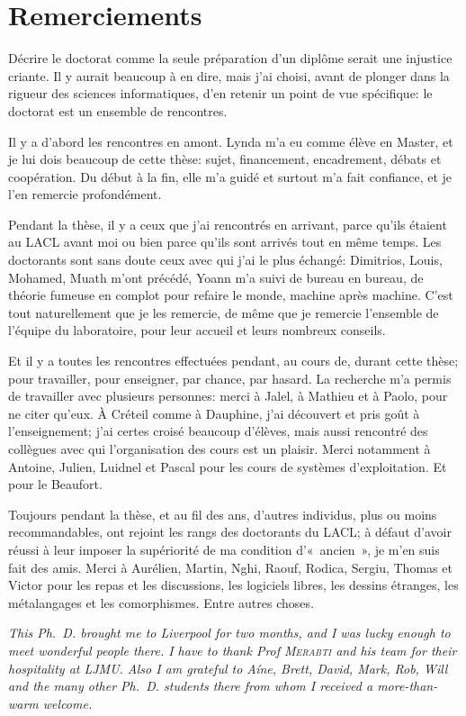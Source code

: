 \chapter{Remerciements}

Décrire le doctorat comme la seule préparation d'un diplôme serait une injustice criante.
Il y aurait beaucoup à en dire, mais j'ai choisi, avant de plonger dans la rigueur des sciences informatiques, d'en retenir un point de vue spécifique: le doctorat est un ensemble de rencontres.

Il y a d'abord les rencontres en amont.
Lynda m'a eu comme élève en Master, et je lui dois beaucoup de cette thèse: sujet, financement, encadrement, débats et coopération.
Du début à la fin, elle m'a guidé et surtout m'a fait confiance, et je l'en remercie profondément.

Pendant la thèse, il y a ceux que j'ai rencontrés en arrivant, parce qu'ils étaient au LACL avant moi ou bien parce qu'ils sont arrivés tout en même temps.
Les doctorants sont sans doute ceux avec qui j'ai le plus échangé: Dimitrios, Louis, Mohamed, Muath m'ont précédé, Yoann m'a suivi de bureau en bureau, de théorie fumeuse en complot pour refaire le monde, machine après machine.
C'est tout naturellement que je les remercie, de même que je remercie l'ensemble de l'équipe du laboratoire, pour leur accueil et leurs nombreux conseils.

Et il y a toutes les rencontres effectuées pendant, au cours de, durant cette thèse; pour travailler, pour enseigner, par chance, par hasard.
La recherche m'a permis de travailler avec plusieurs personnes: merci à Jalel, à Mathieu et à Paolo, pour ne citer qu'eux.
À Créteil comme à Dauphine, j'ai découvert et pris goût à l'enseignement; j'ai certes croisé beaucoup d'élèves, mais aussi rencontré des collègues avec qui l'organisation des cours est un plaisir.
Merci notamment à Antoine, Julien, Luidnel et Pascal pour les cours de systèmes d'exploitation.
Et pour le Beaufort.

Toujours pendant la thèse, et au fil des ans, d'autres individus, plus ou moins recommandables, ont rejoint les rangs des doctorants du LACL; à défaut d'avoir réussi à leur imposer la supériorité de ma condition d'« ancien », je m'en suis fait des amis.
Merci à Aurélien, Martin, Nghi, Raouf, Rodica, Sergiu, Thomas et Victor pour les repas et les discussions, les logiciels libres, les dessins étranges, les métalangages et les comorphismes.
Entre autres choses.

\vfil
\begin{english}
{\it
This Ph.~D. brought me to Liverpool for two months, and I was lucky enough to meet wonderful people there.
I have to thank Prof \textsc{Merabti} and his team for their hospitality at LJMU.
Also I am grateful to Aíne, Brett, David, Mark, Rob, Will and the many other Ph.~D. students there from whom I received a more-than-warm welcome.
}
\end{english}
\vfil

